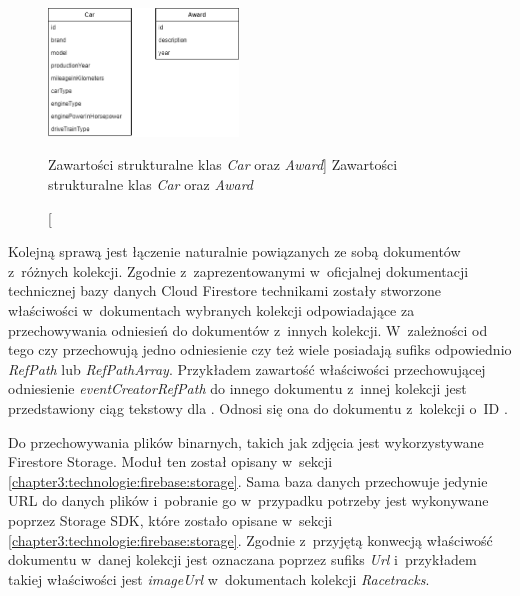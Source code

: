 \documentclass[../Kamil_Kowalewski_Main.tex]{subfiles}
\begin{document}
{{{            \begin{figure}[H]
                \centering
                \includegraphics[width=0.45\textwidth, keepaspectratio]
                {img/chapter4/car_award_diagram.png}
                \caption
                [Zawartości strukturalne klas \textit{Car} oraz \textit{Award}]
                {Zawartości strukturalne klas \textit{Car} oraz \textit{Award}}
                \label{chapter4:dok_techniczna:implementacja:model_danych:diagram}
            \end{figure}

            Kolejną sprawą jest łączenie naturalnie powiązanych ze sobą dokumentów
            z~różnych kolekcji. Zgodnie z~zaprezentowanymi w~oficjalnej dokumentacji
            technicznej bazy danych Cloud Firestore technikami zostały stworzone
            właściwości w~dokumentach wybranych kolekcji odpowiadające za
            przechowywania odniesień do dokumentów z~innych kolekcji. W~zależności od
            tego czy przechowują jedno odniesienie czy też wiele posiadają sufiks
            odpowiednio \textit{RefPath} lub \textit{RefPathArray}. Przykładem
            zawartość właściwości przechowującej odniesienie \textit{eventCreatorRefPath}
            do innego dokumentu z~innej kolekcji jest przedstawiony ciąg tekstowy dla
            . Odnosi się ona do
            dokumentu z~kolekcji  o~ID
             .

            Do przechowywania plików binarnych, takich jak zdjęcia jest wykorzystywane
            Firestore Storage. Moduł ten został opisany w~sekcji
            \ref{chapter3:technologie:firebase:storage}.
            Sama baza danych przechowuje jedynie URL do danych plików i~pobranie go
            w~przypadku potrzeby jest wykonywane poprzez Storage SDK, które zostało
            opisane w~sekcji \ref{chapter3:technologie:firebase:storage}. Zgodnie
            z~przyjętą konwecją właściwość dokumentu w~danej kolekcji jest oznaczana
            poprzez sufiks \textit{Url} i~przykładem takiej właściwości jest
            \textit{imageUrl} w~dokumentach kolekcji \textit{Racetracks}.
        }

}}
\end{document}

